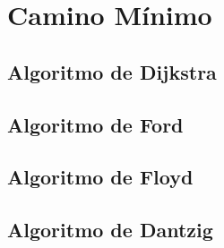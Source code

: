 \newpage
\section{Camino M\'inimo}
\newpage
\subsection{Algoritmo de Dijkstra}
\newpage
\subsection{Algoritmo de Ford}
\newpage
\subsection{Algoritmo de Floyd}
\newpage
\subsection{Algoritmo de Dantzig}